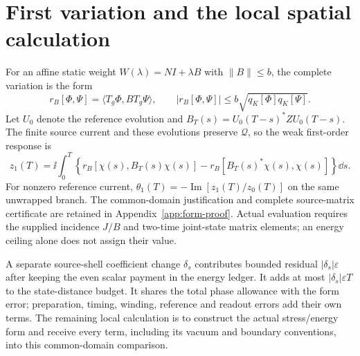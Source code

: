 \section{First variation and the local spatial calculation}
For an affine static weight $W(\lambda)=NI+\lambda B$ with $\|B\|\le b$, the complete variation is the form
\[
 r_B[\Phi,\Psi]=\langle T_g\Phi,BT_g\Psi\rangle,\qquad
 |r_B[\Phi,\Psi]|\le b\sqrt{q_K[\Phi]q_K[\Psi]}.
\]
Let $U_0$ denote the reference evolution and $B_T(s)=U_0(T-s)^*ZU_0(T-s)$. The finite source current and these evolutions preserve $\mathcal Q$, so the weak first-order response is
\[
 z_1(T)=\ii\int_0^T\!\left\{
 r_B[\chi(s),B_T(s)\chi(s)]
 -r_B[B_T(s)^*\chi(s),\chi(s)]\right\}\dd s.
\]
For nonzero reference current, $\theta_1(T)=-\operatorname{Im}[z_1(T)/z_0(T)]$ on the same unwrapped branch. The common-domain justification and complete source-matrix certificate are retained in Appendix~\ref{app:form-proof}. Actual evaluation requires the supplied incidence $J/B$ and two-time joint-state matrix elements; an energy ceiling alone does not assign their value.

A separate source-shell coefficient change $\delta_s$ contributes bounded residual $|\delta_s|\varepsilon$ after keeping the even scalar payment in the energy ledger. It adds at most $|\delta_s|\varepsilon T$ to the state-distance budget. It shares the total phase allowance with the form error; preparation, timing, winding, reference and readout errors add their own terms. The remaining local calculation is to construct the actual stress/energy form and receive every term, including its vacuum and boundary conventions, into this common-domain comparison.
